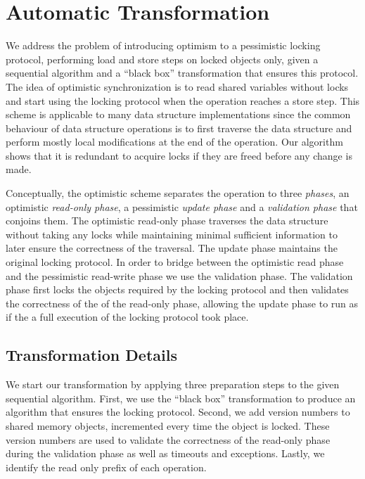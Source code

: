 \section{Automatic Transformation}\label{sec:algorithm}
We address the problem of introducing 
optimism to a pessimistic locking protocol, 
performing load and store steps on locked objects only, 
given a sequential algorithm and a ``black box'' 
transformation that ensures this protocol.
The idea of optimistic synchronization is to read 
shared variables without locks and start using the 
locking protocol when the operation reaches a store step.
This scheme is applicable to many data structure implementations
since the common behaviour of data structure operations 
is to first traverse the data structure and 
perform mostly local modifications at the end of the operation.
Our algorithm shows that it is redundant to 
acquire locks if they are freed before any change is made.    

Conceptually, the optimistic scheme separates the operation to three
\emph{phases}, an optimistic \emph{read-only phase},
a pessimistic \emph{update phase} and a 
\emph{validation phase} that conjoins them. 
The optimistic read-only phase traverses the data 
structure without taking any locks while maintaining 
minimal sufficient information to later ensure the 
correctness of the traversal.
The update phase maintains the original locking protocol. 
In order to bridge between the optimistic read phase and the  
pessimistic read-write phase we use the validation phase. 
The validation phase first locks the objects required by
the locking protocol and then validates the correctness
of the of the read-only phase, allowing the 
update phase to run as if the a full execution of the locking
protocol took place.  

  


\subsection{Transformation Details}
We start our transformation by applying three preparation steps
to the given sequential algorithm. 
First, we use the ``black box'' transformation to produce an
algorithm that ensures the locking protocol. Second, we add 
version numbers to shared memory objects, incremented every 
time the object is locked. These version numbers are used 
to validate the correctness of the read-only phase during 
the validation phase as well as timeouts and exceptions.
Lastly, we identify the read only prefix of each operation. 

